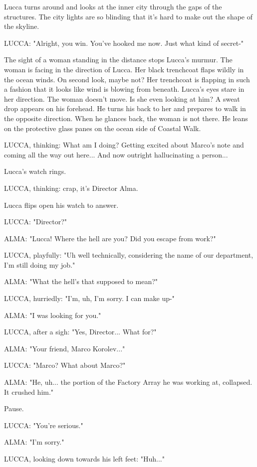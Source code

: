 \documentclass[11pt]{article}
\begin{document}
Lucca turns around and looks at the inner city through the gaps of the structures. 
The city lights are so blinding that it's hard to make out the shape of the skyline.

LUCCA: "Alright, you win. You've hooked me now. Just what kind of secret-"

The sight of a woman standing in the distance stops Lucca's murmur. 
The woman is facing in the direction of Lucca.
Her black trenchcoat flaps wildly in the ocean winds. 
On second look, maybe not?
Her trenchcoat is flapping in such a fashion that it looks like wind is blowing from beneath.
Lucca's eyes stare in her direction. 
The woman doesn't move. Is she even looking at him?
A sweat drop appears on his forehead. 
He turns his back to her and prepares to walk in the opposite direction. 
When he glances back, the woman is not there. 
He leans on the protective glass panes on the ocean side of Coastal Walk. 

LUCCA, thinking: 
What am I doing? 
Getting excited about Marco's note and coming all the way out here...
And now outright hallucinating a person...

Lucca's watch rings. 

LUCCA, thinking: crap, it's Director Alma. 

Lucca flips open his watch to answer.

LUCCA: "Director?"

ALMA: "Lucca! Where the hell are you? Did you escape from work?"

LUCCA, playfully: "Uh well technically, considering the name of our department, I'm still doing my job."

ALMA: "What the hell's that supposed to mean?"

LUCCA, hurriedly: "I'm, uh, I'm sorry. I can make up-"

ALMA: "I was looking for you."

LUCCA, after a sigh: "Yes, Director... What for?"

ALMA: "Your friend, Marco Korolev..."

LUCCA: "Marco? What about Marco?"

ALMA: "He, uh... the portion of the Factory Array he was working at, collapsed. It crushed him."

Pause. 

LUCCA: "You're serious."

ALMA: "I'm sorry."

LUCCA, looking down towards his left feet: "Huh..."
\end{document}
